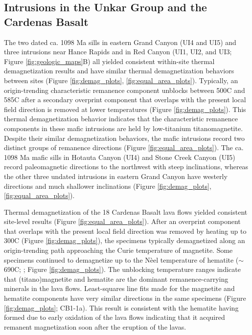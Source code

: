 \documentclass[draft]{agujournal2019}
\begin{document}
\subsection*{Intrusions in the Unkar Group and the Cardenas Basalt}
The two dated ca. 1098 Ma sills in eastern Grand Canyon (UI4 and UI5) and three intrusions near Hance Rapids and in Red Canyon (UI1, UI2, and UI3; Figure \ref{fig:geologic_maps}B) all yielded consistent within-site thermal demagnetization results and have similar thermal demagnetization behaviors between sites (Figure \ref{fig:demag_plots}, \ref{fig:equal_area_plots}). Typically, an origin-trending characteristic remanence component unblocks between 500\textdegree C and 585\textdegree C after a secondary overprint component that overlaps with the present local field direction is removed at lower temperatures (Figure \ref{fig:demag_plots}). This thermal demagnetization behavior indicates that the characteristic remanence components in these mafic intrusions are held by low-titanium titanomagnetite. Despite their similar demagnetization behaviors, the mafic intrusions record two distinct groups of remanence directions (Figure \ref{fig:equal_area_plots}). The ca. 1098 Ma mafic sills in Hotauta Canyon (UI4) and Stone Creek Canyon (UI5) record paleomagnetic directions to the northwest with steep inclinations, whereas the other three undated intrusions in eastern Grand Canyon have westerly directions and much shallower inclinations (Figure \ref{fig:demag_plots}, \ref{fig:equal_area_plots}). 

Thermal demagnetization of the 18 Cardenas Basalt lava flows yielded consistent site-level results (Figure \ref{fig:equal_area_plots}). After an overprint component that overlaps with the present local field direction was removed by heating up to 300\textdegree C (Figure \ref{fig:demag_plots}), the specimens typically demagnetized along an origin-trending path approaching the Curie temperature of magnetite. Some specimens continued to demagnetize up to the N\`eel temperature of hematite ($\sim$690\textdegree C; ; Figure \ref{fig:demag_plots}). The unblocking temperature ranges indicate that (titano)magnetite and hematite are the dominant remanence-carrying minerals in the lava flows. Least-squares line fits made for the magnetite and hematite components have very similar directions in the same specimens (Figure \ref{fig:demag_plots}; CB1-1a). This result is consistent with the hematite having formed due to early oxidation of the lava flows indicating that it acquired remanent magnetization soon after the eruption of the lavas. 
\end{document}
